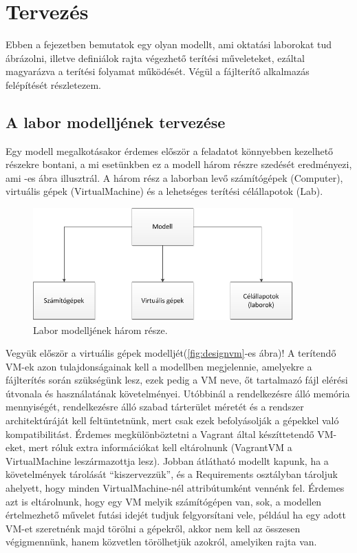\chapter{Tervezés}
\label{chp:design}
Ebben a fejezetben bemutatok egy olyan modellt, ami oktatási laborokat tud ábrázolni, illetve definiálok rajta végezhető terítési műveleteket, ezáltal magyarázva a terítési folyamat működését. Végül a fájlterítő alkalmazás felépítését részletezem.

\section{A labor modelljének tervezése}
\label{design_model}

Egy modell megalkotásakor érdemes először a feladatot könnyebben kezelhető részekre bontani, a mi esetünkben ez a modell három részre szedését eredményezi, ami -es ábra illusztrál. A három rész a laborban levő számítógépek (Computer), virtuális gépek (VirtualMachine) és a lehetséges terítési célállapotok (Lab).

\begin{figure}[ht]
	\centering
	\includegraphics[width=100mm, keepaspectratio]{figures/design_modelparts.png}
	\caption{Labor modelljének három része.}
	\label{fig:designmodelparts}
\end{figure}

Vegyük először a virtuális gépek modelljét(\ref{fig:designvm}-es ábra)! A terítendő VM-ek azon tulajdonságainak kell a modellben megjelennie, amelyekre a fájlterítés során szükségünk lesz, ezek pedig a VM neve, őt tartalmazó fájl elérési útvonala és használatának követelményei. Utóbbinál a rendelkezésre álló memória mennyiségét, rendelkezésre álló szabad tárterület méretét és a rendszer architektúráját kell feltüntetnünk, mert csak ezek befolyásolják a gépekkel való kompatibilitást. Érdemes megkülönböztetni a Vagrant által készíttetendő VM-eket, mert róluk extra információkat kell eltárolnunk (VagrantVM a VirtualMachine leszármazottja lesz). Jobban átlátható modellt kapunk, ha a követelmények tárolását ``kiszervezzük'', és a Requirements osztályban tároljuk ahelyett, hogy minden VirtualMachine-nél attribútumként vennénk fel. Érdemes azt is eltárolnunk, hogy egy VM melyik számítógépen van, sok, a modellen értelmezhető művelet futási idejét tudjuk felgyorsítani vele, például ha egy adott VM-et szeretnénk majd törölni a gépekről, akkor nem kell az összesen végigmennünk, hanem közvetlen törölhetjük azokról, amelyiken rajta van.

